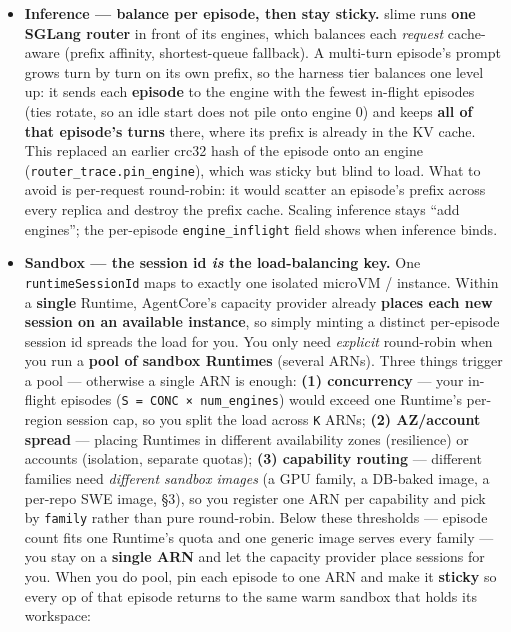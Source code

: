 \documentclass[
  paper=a4,
  ,captions=tableheading
]{scrartcl}
\providecommand{\tightlist}{%
  \setlength{\itemsep}{0pt}\setlength{\parskip}{0pt}}
\begin{document}
\begin{itemize}
\tightlist
\item
  \textbf{Inference --- balance per episode, then stay sticky.} slime
  runs \textbf{one SGLang router} in front of its engines, which
  balances each \emph{request} cache-aware (prefix affinity,
  shortest-queue fallback). A multi-turn episode's prompt grows turn by
  turn on its own prefix, so the harness tier balances one level up: it
  sends each \textbf{episode} to the engine with the fewest in-flight
  episodes (ties rotate, so an idle start does not pile onto engine 0)
  and keeps \textbf{all of that episode's turns} there, where its prefix
  is already in the KV cache. This replaced an earlier crc32 hash of the
  episode onto an engine (\texttt{router\_trace.pin\_engine}), which was
  sticky but blind to load. What to avoid is per-request round-robin: it
  would scatter an episode's prefix across every replica and destroy the
  prefix cache. Scaling inference stays ``add engines''; the per-episode
  \texttt{engine\_inflight} field shows when inference binds.
\item
  \textbf{Sandbox --- the session id \emph{is} the load-balancing key.}
  One \texttt{runtimeSessionId} maps to exactly one isolated microVM /
  instance. Within a \textbf{single} Runtime, AgentCore's capacity
  provider already \textbf{places each new session on an available
  instance}, so simply minting a distinct per-episode session id spreads
  the load for you. You only need \emph{explicit} round-robin when you
  run a \textbf{pool of sandbox Runtimes} (several ARNs). Three things
  trigger a pool --- otherwise a single ARN is enough: \textbf{(1)
  concurrency} --- your in-flight episodes
  (\texttt{S\ =\ CONC\ ×\ num\_engines}) would exceed one Runtime's
  per-region session cap, so you split the load across \texttt{K} ARNs;
  \textbf{(2) AZ/account spread} --- placing Runtimes in different
  availability zones (resilience) or accounts (isolation, separate
  quotas); \textbf{(3) capability routing} --- different families need
  \emph{different sandbox images} (a GPU family, a DB-baked image, a
  per-repo SWE image, §3), so you register one ARN per capability and
  pick by \texttt{family} rather than pure round-robin. Below these
  thresholds --- episode count fits one Runtime's quota and one generic
  image serves every family --- you stay on a \textbf{single ARN} and
  let the capacity provider place sessions for you. When you do pool,
  pin each episode to one ARN and make it \textbf{sticky} so every op of
  that episode returns to the same warm sandbox that holds its
  workspace:
\end{itemize}
\end{document}
